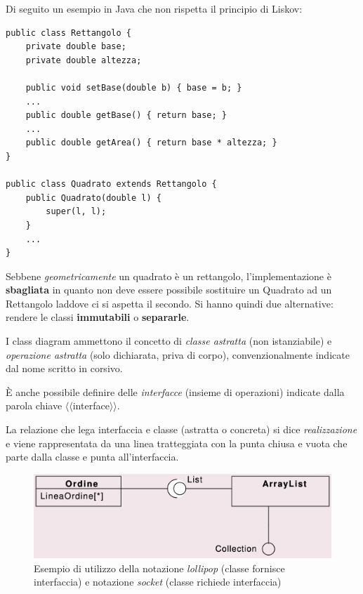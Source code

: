 Di seguito un esempio in Java che non rispetta il principio di Liskov:
\begin{verbatim}
public class Rettangolo {
    private double base;
    private double altezza;

    public void setBase(double b) { base = b; }
    ...
    public double getBase() { return base; }
    ...
    public double getArea() { return base * altezza; }
}

public class Quadrato extends Rettangolo {
    public Quadrato(double l) {
        super(l, l);
    }
    ...
}
\end{verbatim}

Sebbene \textit{geometricamente} un quadrato è un rettangolo, l'implementazione è \textbf{sbagliata} in quanto non deve essere possibile sostituire un Quadrato ad un Rettangolo laddove ci si aspetta il secondo. Si hanno quindi due alternative: rendere le classi \textbf{immutabili} o \textbf{separarle}.

I class diagram ammettono il concetto di \textit{classe astratta} (non istanziabile) e \textit{operazione astratta} (solo dichiarata, priva di corpo), convenzionalmente indicate dal nome scritto in corsivo.

È anche possibile definire delle \textit{interfacce} (insieme di operazioni) indicate dalla parola chiave $\langle\langle$interface$\rangle\rangle$.

La relazione che lega interfaccia e classe (astratta o concreta) si dice \textit{realizzazione} e viene rappresentata da una linea tratteggiata con la punta chiusa e vuota che parte dalla classe e punta all'interfaccia.

\begin{figure}[H]
    \centering
    \includegraphics[width=0.75\linewidth]{assets/UML/class/class-9.png}
    \caption{Esempio di utilizzo della notazione \textit{lollipop} (classe fornisce interfaccia) e notazione \textit{socket} (classe richiede interfaccia)}
\end{figure}

